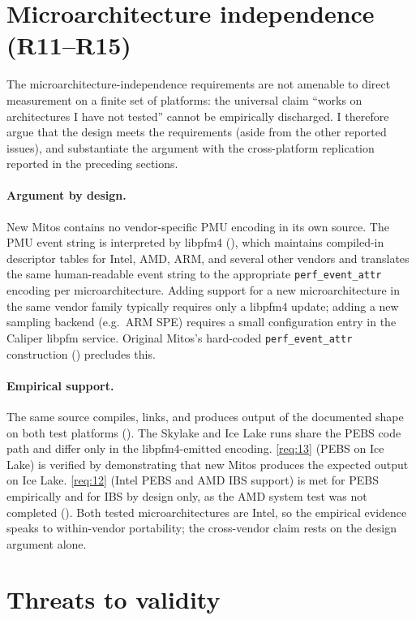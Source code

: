 \section{Microarchitecture independence (R11--R15)}\label{sec:eval-archindep}

The microarchitecture-independence requirements are not amenable to direct measurement on a finite set of platforms: the universal claim ``works on architectures I have not tested'' cannot be empirically discharged. I therefore argue that the design meets the requirements (aside from the other reported issues), and substantiate the argument with the cross-platform replication reported in the preceding sections.

\paragraph{Argument by design.} New Mitos contains no vendor-specific PMU encoding in its own source. The PMU event string is interpreted by libpfm4 (), which maintains compiled-in descriptor tables for Intel, AMD, ARM, and several other vendors and translates the same human-readable event string to the appropriate \texttt{perf\_event\_attr} encoding per microarchitecture. Adding support for a new microarchitecture in the same vendor family typically requires only a libpfm4 update; adding a new sampling backend (e.g.\ ARM SPE) requires a small configuration entry in the Caliper libpfm service. Original Mitos's hard-coded \texttt{perf\_event\_attr} construction () precludes this.

\paragraph{Empirical support.} The same source compiles, links, and produces output of the documented shape on both test platforms (). The Skylake and Ice Lake runs share the PEBS code path and differ only in the libpfm4-emitted encoding. \ref{req:13} (PEBS on Ice Lake) is verified by demonstrating that new Mitos produces the expected output on Ice Lake. \ref{req:12} (Intel PEBS and AMD IBS support) is met for PEBS empirically and for IBS by design only, as the AMD system test was not completed (). Both tested microarchitectures are Intel, so the empirical evidence speaks to within-vendor portability; the cross-vendor claim rests on the design argument alone.

\section{Threats to validity}\label{sec:eval-threats}

